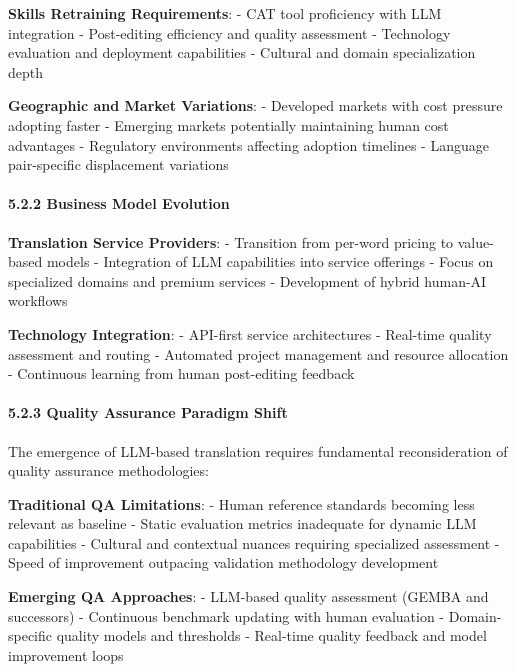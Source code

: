 \documentclass[12pt,a4paper]{article}
\begin{document}
{{{{\textbf{Skills Retraining Requirements}: - CAT tool proficiency with LLM
integration - Post-editing efficiency and quality assessment -
Technology evaluation and deployment capabilities - Cultural and domain
specialization depth

\textbf{Geographic and Market Variations}: - Developed markets with cost
pressure adopting faster - Emerging markets potentially maintaining
human cost advantages - Regulatory environments affecting adoption
timelines - Language pair-specific displacement variations

\hypertarget{business-model-evolution}{%
\paragraph{5.2.2 Business Model
Evolution}\label{business-model-evolution}}

\textbf{Translation Service Providers}: - Transition from per-word
pricing to value-based models - Integration of LLM capabilities into
service offerings - Focus on specialized domains and premium services -
Development of hybrid human-AI workflows

\textbf{Technology Integration}: - API-first service architectures -
Real-time quality assessment and routing - Automated project management
and resource allocation - Continuous learning from human post-editing
feedback

\hypertarget{quality-assurance-paradigm-shift}{%
\paragraph{5.2.3 Quality Assurance Paradigm
Shift}\label{quality-assurance-paradigm-shift}}

The emergence of LLM-based translation requires fundamental
reconsideration of quality assurance methodologies:

\textbf{Traditional QA Limitations}: - Human reference standards
becoming less relevant as baseline - Static evaluation metrics
inadequate for dynamic LLM capabilities - Cultural and contextual
nuances requiring specialized assessment - Speed of improvement
outpacing validation methodology development

\textbf{Emerging QA Approaches}: - LLM-based quality assessment (GEMBA
and successors) - Continuous benchmark updating with human evaluation -
Domain-specific quality models and thresholds - Real-time quality
feedback and model improvement loops

\hypertarget{theoretical-contributions}{%
}}}}}
\end{document}

